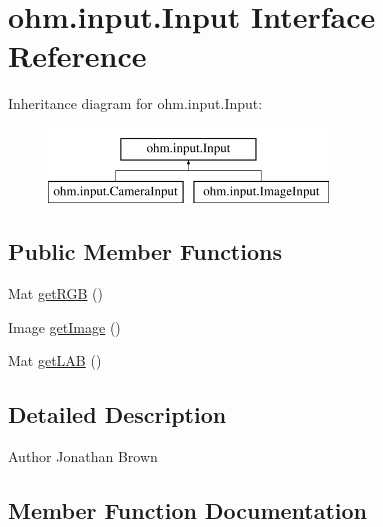 \hypertarget{interfaceohm_1_1input_1_1_input}{}\section{ohm.\+input.\+Input Interface Reference}
\label{interfaceohm_1_1input_1_1_input}
Inheritance diagram for ohm.\+input.\+Input\+:\begin{figure}[H]
\begin{center}
\leavevmode
\includegraphics[height=2.000000cm]{interfaceohm_1_1input_1_1_input}
\end{center}
\end{figure}
\subsection*{Public Member Functions}
\begin{DoxyCompactItemize}
\item 
Mat \hyperlink{interfaceohm_1_1input_1_1_input_ac9877f2cacdb85c06af084fd426495fd}{get\+R\+GB} ()
\item 
Image \hyperlink{interfaceohm_1_1input_1_1_input_aecea73d845b9c88e69294dadcd15e4fe}{get\+Image} ()
\item 
Mat \hyperlink{interfaceohm_1_1input_1_1_input_a3264bf8e72c6442076453b5d356b6534}{get\+L\+AB} ()
\end{DoxyCompactItemize}


\subsection{Detailed Description}
\begin{DoxyAuthor}{Author}
Jonathan Brown 
\end{DoxyAuthor}


\subsection{Member Function Documentation}
\hypertarget{interfaceohm_1_1input_1_1_input_aecea73d845b9c88e69294dadcd15e4fe}{}\label{interfaceohm_1_1input_1_1_input_aecea73d845b9c88e69294dadcd15e4fe} 
